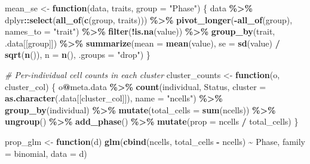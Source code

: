 \documentclass[
  landscape]{article}
\newenvironment{Shaded}{\begin{snugshade}}{\end{snugshade}}
\newcommand{\AttributeTok}[1]{\textcolor[rgb]{0.13,0.29,0.53}{#1}}
\newcommand{\CommentTok}[1]{\textcolor[rgb]{0.56,0.35,0.01}{\textit{#1}}}
\newcommand{\ControlFlowTok}[1]{\textcolor[rgb]{0.13,0.29,0.53}{\textbf{#1}}}
\newcommand{\FunctionTok}[1]{\textcolor[rgb]{0.13,0.29,0.53}{\textbf{#1}}}
\newcommand{\NormalTok}[1]{#1}
\newcommand{\OtherTok}[1]{\textcolor[rgb]{0.56,0.35,0.01}{#1}}
\newcommand{\SpecialCharTok}[1]{\textcolor[rgb]{0.81,0.36,0.00}{\textbf{#1}}}
\newcommand{\StringTok}[1]{\textcolor[rgb]{0.31,0.60,0.02}{#1}}
\begin{document}
\begin{Shaded}
\begin{Highlighting}[]
\NormalTok{mean\_se }\OtherTok{\textless{}{-}} \ControlFlowTok{function}\NormalTok{(data, traits, }\AttributeTok{group =} \StringTok{"Phase"}\NormalTok{) \{}
\NormalTok{  data }\SpecialCharTok{\%\textgreater{}\%}
\NormalTok{    dplyr}\SpecialCharTok{::}\FunctionTok{select}\NormalTok{(}\FunctionTok{all\_of}\NormalTok{(}\FunctionTok{c}\NormalTok{(group, traits))) }\SpecialCharTok{\%\textgreater{}\%}
    \FunctionTok{pivot\_longer}\NormalTok{(}\SpecialCharTok{{-}}\FunctionTok{all\_of}\NormalTok{(group), }\AttributeTok{names\_to =} \StringTok{"trait"}\NormalTok{) }\SpecialCharTok{\%\textgreater{}\%}
    \FunctionTok{filter}\NormalTok{(}\SpecialCharTok{!}\FunctionTok{is.na}\NormalTok{(value)) }\SpecialCharTok{\%\textgreater{}\%}
    \FunctionTok{group\_by}\NormalTok{(trait, .data[[group]]) }\SpecialCharTok{\%\textgreater{}\%}
    \FunctionTok{summarize}\NormalTok{(}\AttributeTok{mean =} \FunctionTok{mean}\NormalTok{(value), }\AttributeTok{se =} \FunctionTok{sd}\NormalTok{(value) }\SpecialCharTok{/} \FunctionTok{sqrt}\NormalTok{(}\FunctionTok{n}\NormalTok{()), }\AttributeTok{n =} \FunctionTok{n}\NormalTok{(), }\AttributeTok{.groups =} \StringTok{"drop"}\NormalTok{)}
\NormalTok{\}}

\CommentTok{\# Per{-}individual cell counts in each cluster}
\NormalTok{cluster\_counts }\OtherTok{\textless{}{-}} \ControlFlowTok{function}\NormalTok{(o, cluster\_col) \{}
\NormalTok{  o}\SpecialCharTok{@}\NormalTok{meta.data }\SpecialCharTok{\%\textgreater{}\%}
    \FunctionTok{count}\NormalTok{(individual, Status, }\AttributeTok{cluster =} \FunctionTok{as.character}\NormalTok{(.data[[cluster\_col]]), }\AttributeTok{name =} \StringTok{"ncells"}\NormalTok{) }\SpecialCharTok{\%\textgreater{}\%}
    \FunctionTok{group\_by}\NormalTok{(individual) }\SpecialCharTok{\%\textgreater{}\%}
    \FunctionTok{mutate}\NormalTok{(}\AttributeTok{total\_cells =} \FunctionTok{sum}\NormalTok{(ncells)) }\SpecialCharTok{\%\textgreater{}\%}
    \FunctionTok{ungroup}\NormalTok{() }\SpecialCharTok{\%\textgreater{}\%}
    \FunctionTok{add\_phase}\NormalTok{() }\SpecialCharTok{\%\textgreater{}\%}
    \FunctionTok{mutate}\NormalTok{(}\AttributeTok{prop =}\NormalTok{ ncells }\SpecialCharTok{/}\NormalTok{ total\_cells)}
\NormalTok{\}}

\NormalTok{prop\_glm }\OtherTok{\textless{}{-}} \ControlFlowTok{function}\NormalTok{(d) }\FunctionTok{glm}\NormalTok{(}\FunctionTok{cbind}\NormalTok{(ncells, total\_cells }\SpecialCharTok{{-}}\NormalTok{ ncells) }\SpecialCharTok{\textasciitilde{}}\NormalTok{ Phase, }\AttributeTok{family =}\NormalTok{ binomial, }\AttributeTok{data =}\NormalTok{ d)}


\end{Highlighting}
\end{Shaded}
\end{document}
